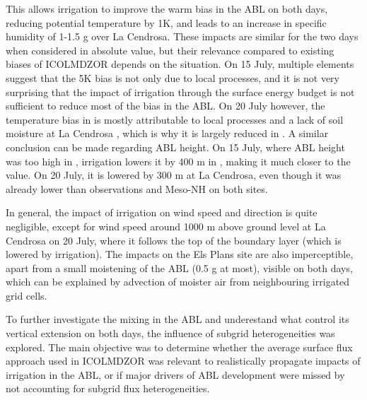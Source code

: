 This allows irrigation to improve the warm bias in the ABL on both days, reducing potential temperature by 1K, and leads to an increase in specific humidity of 1-1.5 g \perkg over La Cendrosa.
These impacts are similar for the two days when considered in absolute value, but their relevance compared to existing biases of ICOLMDZOR depends on the situation.
On 15 July, multiple elements suggest that the 5K bias is not only due to local processes, and it is not very surprising that the impact of irrigation through the surface energy budget is not sufficient to reduce most of the bias in the ABL. On 20 July however, the temperature bias in \noirr is mostly attributable to local processes and a lack of soil moisture at La Cendrosa , which is why it is largely reduced in \irrboost. 
A similar conclusion can be made regarding ABL height. On 15 July, where ABL height was too high in \noirr, irrigation lowers it by 400 m in \irrboost, making it much closer to the \mesomean value. On 20 July, it is lowered by 300 m at La Cendrosa, even though it was already lower than observations and Meso-NH on both sites.

In general, the impact of irrigation on wind speed and direction is quite negligible, except for wind speed around 1000 m above ground level at La Cendrosa on 20 July, where it follows the top of the boundary layer (which is lowered by irrigation).
The impacts on the Els Plans site are also imperceptible, apart from a small moistening of the ABL (0.5 g \perkg at most), visible on both days, which can be explained by advection of moister air from neighbouring irrigated grid cells.

To further investigate the mixing in the ABL and underestand what control its vertical extension on both days, the influence of subgrid heterogeneities was explored.
The main objective was to determine whether the average surface flux approach used in ICOLMDZOR was relevant to realistically propagate impacts of irrigation in the ABL, or if major drivers of ABL development were missed by not accounting for subgrid flux heterogeneities. 

